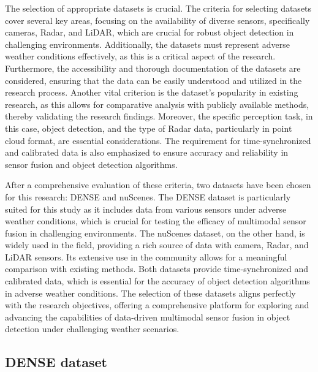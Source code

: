 \documentclass[report.tex]{subfiles}
\begin{document}

    The selection of appropriate datasets is crucial. The criteria for selecting datasets cover several key areas, focusing on the availability of diverse sensors, specifically cameras, Radar, and LiDAR, which are crucial for robust object detection in challenging environments. Additionally, the datasets must represent adverse weather conditions effectively, as this is a critical aspect of the research. Furthermore, the accessibility and thorough documentation of the datasets are considered, ensuring that the data can be easily understood and utilized in the research process. Another vital criterion is the dataset's popularity in existing research, as this allows for comparative analysis with publicly available methods, thereby validating the research findings. Moreover, the specific perception task, in this case, object detection, and the type of Radar data, particularly in point cloud format, are essential considerations. The requirement for time-synchronized and calibrated data is also emphasized to ensure accuracy and reliability in sensor fusion and object detection algorithms.

    After a comprehensive evaluation of these criteria, two datasets have been chosen for this research: DENSE and nuScenes. The DENSE dataset is particularly suited for this study as it includes data from various sensors under adverse weather conditions, which is crucial for testing the efficacy of multimodal sensor fusion in challenging environments. The nuScenes dataset, on the other hand, is widely used in the field, providing a rich source of data with camera, Radar, and LiDAR sensors. Its extensive use in the community allows for a meaningful comparison with existing methods. Both datasets provide time-synchronized and calibrated data, which is essential for the accuracy of object detection algorithms in adverse weather conditions. The selection of these datasets aligns perfectly with the research objectives, offering a comprehensive platform for exploring and advancing the capabilities of data-driven multimodal sensor fusion in object detection under challenging weather scenarios.

    \subsection{DENSE dataset}
    \label{subsec:dense_dataset}
\end{document}
